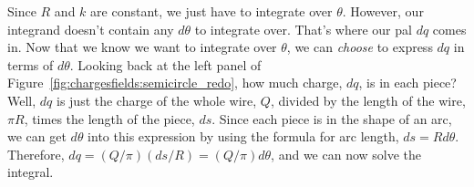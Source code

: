 \begin{framed}
Since $R$ and $k$ are constant, we just have to integrate over $\theta$. However, our integrand doesn't contain any $d\theta$ to integrate over. That's where our pal $dq$ comes in. Now that we know we want to integrate over $\theta$, we can \textit{choose} to express $dq$ in terms of $d\theta$. Looking back at the left panel of Figure~\ref{fig:chargesfields:semicircle_redo}, how much charge, $dq$, is in each piece? Well, $dq$ is just the charge of the whole wire, $Q$, divided by the length of the wire, $\pi R$, times the length of the piece, $ds$. Since each piece is in the shape of an arc, we can get $d\theta$ into this expression by using the formula for arc length, $ds=Rd\theta$. Therefore, $dq=(Q/\pi)( ds/R)=(Q/\pi)d\theta$, and we can now solve the integral.
\end{framed}

